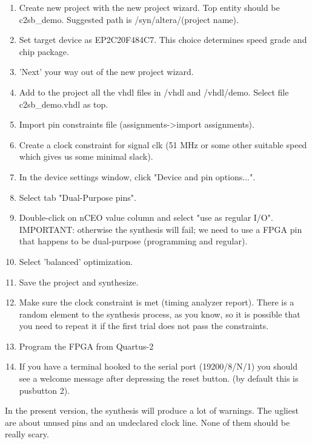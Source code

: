 \documentclass[11pt]{article}
\begin{document}
    \begin{enumerate}
        \item Create new project with the new project wizard.
            Top entity should be c2sb\_demo.
            Suggested path is /syn/altera/(project name).
        \item Set target device as EP2C20F484C7.
            This choice determines speed grade and chip package.
        \item 'Next' your way out of the new project wizard.
        \item Add to the project all the vhdl files in /vhdl and /vhdl/demo.
            Select file c2sb\_demo.vhdl as top.
        \item Import pin constraints file (assignments-\textgreater import assignments).
        \item Create a clock constraint for signal clk (51 MHz or some other
            suitable speed which gives us some minimal slack).
        \item In the device settings window, click "Device and pin options...".
        \item Select tab "Dual-Purpose pins".
        \item Double-click on nCEO value column and select "use as regular I/O".
            IMPORTANT: otherwise the synthesis will fail; we need to use a FPGA
            pin that happens to be dual-purpose (programming and regular).
        \item Select 'balanced' optimization.
        \item Save the project and synthesize.
        \item Make sure the clock constraint is met (timing analyzer report).
            There is a random element to the synthesis process, as you know,
            so it is possible that you need to repeat it if the first trial does
            not pass the constraints.
        \item Program the FPGA from Quartus-2
        \item If you have a terminal hooked to the serial port (19200/8/N/1) you
            should see a welcome message after depressing the reset button.
            (by default this is pusbutton 2).

    \end{enumerate}
    
    In the present version, the synthesis will produce a lot of warnings. The 
    ugliest are about unused pins and an undeclared clock line. None of them 
    should be really scary.\\
\end{document}
